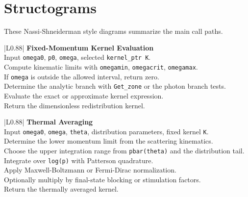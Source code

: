 \documentclass[11pt]{article}
\begin{document}
\section{Structograms}

These Nassi-Shneiderman style diagrams summarize the main call paths.

\begin{center}
\small
\begin{tabular}{|L{0.88\linewidth}|}
\hline
\textbf{Fixed-Momentum Kernel Evaluation} \\
\hline
Input \texttt{omega0}, \texttt{p0}, \texttt{omega}, selected \texttt{kernel\_ptr K}. \\
\hline
Compute kinematic limits with \texttt{omegamin}, \texttt{omegacrit}, \texttt{omegamax}. \\
\hline
If \texttt{omega} is outside the allowed interval, return zero. \\
\hline
Determine the analytic branch with \texttt{Get\_zone} or the photon branch tests. \\
\hline
Evaluate the exact or approximate kernel expression. \\
\hline
Return the dimensionless redistribution kernel. \\
\hline
\end{tabular}
\end{center}

\begin{center}
\small
\begin{tabular}{|L{0.88\linewidth}|}
\hline
\textbf{Thermal Averaging} \\
\hline
Input \texttt{omega0}, \texttt{omega}, \texttt{theta}, distribution parameters, fixed kernel \texttt{K}. \\
\hline
Determine the lower momentum limit from the scattering kinematics. \\
\hline
Choose the upper integration range from \texttt{pbar(theta)} and the distribution tail. \\
\hline
Integrate over \texttt{log(p)} with Patterson quadrature. \\
\hline
Apply Maxwell-Boltzmann or Fermi-Dirac normalization. \\
\hline
Optionally multiply by final-state blocking or stimulation factors. \\
\hline
Return the thermally averaged kernel. \\
\hline
\end{tabular}
\end{center}
\end{document}
